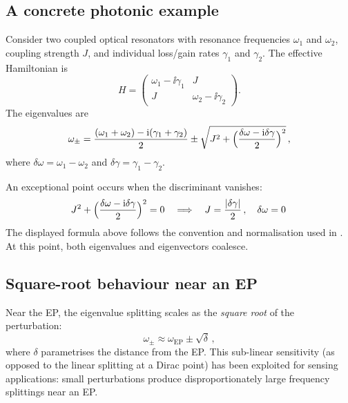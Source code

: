 \subsection{A concrete photonic example}
\label{sec:ch17-ep-example}

Consider two coupled optical resonators with resonance frequencies
$\omega_1$ and $\omega_2$, coupling strength $J$, and individual
loss/gain rates $\gamma_1$ and $\gamma_2$.  The effective Hamiltonian
is
\begin{equation}\label{eq:ch17-coupled-resonators}
  H = \begin{pmatrix}
    \omega_1-\ii\gamma_1 & J \\
    J & \omega_2-\ii\gamma_2
  \end{pmatrix}.
\end{equation}
The eigenvalues are
\begin{equation}\label{eq:ch17-coupled-eigenvalues}
  \omega_\pm = \frac{(\omega_1+\omega_2)-\mathrm{i}(\gamma_1+\gamma_2)}{2}
  \pm\sqrt{J^2+\Bigl(\frac{\delta\omega-\mathrm{i}\delta\gamma}{2}\Bigr)^2}\,,
\end{equation}
where $\delta\omega=\omega_1-\omega_2$ and
$\delta\gamma=\gamma_1-\gamma_2$.

An exceptional point occurs when the discriminant vanishes:
\begin{equation}\label{eq:ch17-ep-condition}
  J^2 + \Bigl(\frac{\delta\omega-\mathrm{i}\delta\gamma}{2}\Bigr)^2 = 0
  \quad\Longrightarrow\quad
  J = \frac{|\delta\gamma|}{2}\,,\quad \delta\omega=0\,
\end{equation}
The displayed formula above follows the convention and normalisation used in \cite{wan2011time}.
At this point, both eigenvalues and eigenvectors coalesce.

\subsection{Square-root behaviour near an EP}
\label{sec:ch17-ep-sqrt}

Near the EP, the eigenvalue splitting scales as the \emph{square root}
of the perturbation:
\begin{equation}\label{eq:ch17-ep-splitting}
  \omega_\pm \approx \omega_{\mathrm{EP}} \pm \sqrt{\delta}\,,
\end{equation}
where $\delta$ parametrises the distance from the EP.  This
sub-linear sensitivity (as opposed to the linear splitting at a Dirac
point) has been exploited for sensing applications:  small perturbations
produce disproportionately large frequency splittings near an EP.

